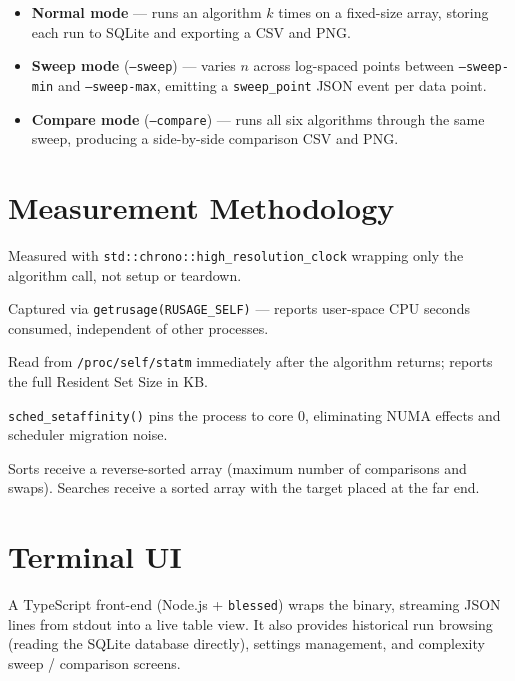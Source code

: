 \documentclass[12pt,a4paper]{report}
\begin{document}
\begin{itemize}[leftmargin=2em]
  \item \textbf{Normal mode} --- runs an algorithm $k$ times on a fixed-size array,
        storing each run to SQLite and exporting a CSV and PNG.
  \item \textbf{Sweep mode} (\texttt{--sweep}) --- varies $n$ across log-spaced
        points between \texttt{--sweep-min} and \texttt{--sweep-max}, emitting a
        \texttt{sweep\_point} JSON event per data point.
  \item \textbf{Compare mode} (\texttt{--compare}) --- runs all six algorithms
        through the same sweep, producing a side-by-side comparison CSV and PNG.
\end{itemize}

\section{Measurement Methodology}

\begin{description}[leftmargin=2em, font=\bfseries]
  \item[Wall-clock time] Measured with \texttt{std::chrono::high\_resolution\_clock}
    wrapping only the algorithm call, not setup or teardown.
  \item[CPU time] Captured via \texttt{getrusage(RUSAGE\_SELF)} --- reports user-space
    CPU seconds consumed, independent of other processes.
  \item[Memory (RSS)] Read from \texttt{/proc/self/statm} immediately after the
    algorithm returns; reports the full Resident Set Size in KB.
  \item[CPU Affinity] \texttt{sched\_setaffinity()} pins the process to core 0,
    eliminating NUMA effects and scheduler migration noise.
  \item[Worst-case data] Sorts receive a reverse-sorted array (maximum number of
    comparisons and swaps). Searches receive a sorted array with the target placed
    at the far end.
\end{description}

\section{Terminal UI}

A TypeScript front-end (Node.js + \texttt{blessed}) wraps the binary, streaming
JSON lines from stdout into a live table view. It also provides historical run
browsing (reading the SQLite database directly), settings management, and
complexity sweep / comparison screens.
\end{document}
